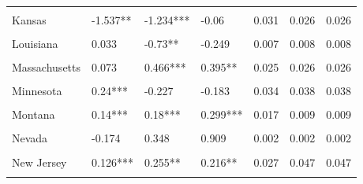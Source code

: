 \begin{table}[!h]
\begin{tabular}[t]{llllrrr}
\cellcolor{gray!10}{Indiana} & \cellcolor{gray!10}{0.093***} & \cellcolor{gray!10}{0.002} & \cellcolor{gray!10}{-0.045} & \cellcolor{gray!10}{0.032} & \cellcolor{gray!10}{0.036} & \cellcolor{gray!10}{0.036}\\
Kansas & -1.537** & -1.234*** & -0.06 & 0.031 & 0.026 & 0.026\\
\cellcolor{gray!10}{Kentucky} & \cellcolor{gray!10}{0.197***} & \cellcolor{gray!10}{0.01} & \cellcolor{gray!10}{0.249***} & \cellcolor{gray!10}{0.017} & \cellcolor{gray!10}{0.020} & \cellcolor{gray!10}{0.020}\\
Louisiana & 0.033 & -0.73** & -0.249 & 0.007 & 0.008 & 0.008\\
\cellcolor{gray!10}{Maine} & \cellcolor{gray!10}{0.121***} & \cellcolor{gray!10}{NA} & \cellcolor{gray!10}{NA} & \cellcolor{gray!10}{0.012} & \cellcolor{gray!10}{NA} & \cellcolor{gray!10}{NA}\\
Massachusetts & 0.073 & 0.466*** & 0.395** & 0.025 & 0.026 & 0.026\\
\cellcolor{gray!10}{Michigan} & \cellcolor{gray!10}{0.101***} & \cellcolor{gray!10}{-0.321***} & \cellcolor{gray!10}{-0.214*} & \cellcolor{gray!10}{0.057} & \cellcolor{gray!10}{0.061} & \cellcolor{gray!10}{0.061}\\
Minnesota & 0.24*** & -0.227 & -0.183 & 0.034 & 0.038 & 0.038\\
\cellcolor{gray!10}{Mississippi} & \cellcolor{gray!10}{0.246***} & \cellcolor{gray!10}{0.004} & \cellcolor{gray!10}{0.112} & \cellcolor{gray!10}{0.013} & \cellcolor{gray!10}{0.015} & \cellcolor{gray!10}{0.015}\\
Montana & 0.14*** & 0.18*** & 0.299*** & 0.017 & 0.009 & 0.009\\
\cellcolor{gray!10}{Nebraska} & \cellcolor{gray!10}{0.132***} & \cellcolor{gray!10}{0.204} & \cellcolor{gray!10}{0.501***} & \cellcolor{gray!10}{0.025} & \cellcolor{gray!10}{0.016} & \cellcolor{gray!10}{0.016}\\
Nevada & -0.174 & 0.348 & 0.909 & 0.002 & 0.002 & 0.002\\
\cellcolor{gray!10}{New Hampshire} & \cellcolor{gray!10}{0.461**} & \cellcolor{gray!10}{-0.167} & \cellcolor{gray!10}{-0.054} & \cellcolor{gray!10}{0.007} & \cellcolor{gray!10}{0.010} & \cellcolor{gray!10}{0.010}\\
New Jersey & 0.126*** & 0.255** & 0.216** & 0.027 & 0.047 & 0.047\\
\cellcolor{gray!10}{New Mexico} & \cellcolor{gray!10}{-0.434} & \cellcolor{gray!10}{0.271} & \cellcolor{gray!10}{0.048} & \cellcolor{gray!10}{0.010} & \cellcolor{gray!10}{0.005} & \cellcolor{gray!10}{0.005}\\

\end{tabular}
\end{table}
